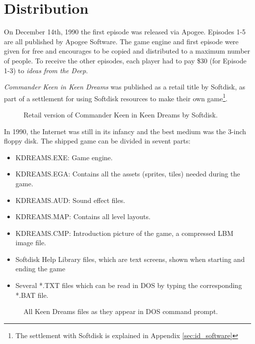 \documentclass[book.tex]{subfiles}
\begin{document}
\section{Distribution}
On December 14th, 1990 the first episode was released via Apogee. Episodes 1-5 are all published by Apogee Software. The game engine and first episode were given for free and encourages to be copied and distributed to a maximum number of people. To receive the other episodes, each player had to pay \$30 (for Episode 1-3) to \textit{ideas from the Deep}.\\

\par
\textit{Commander Keen in Keen Dreams} was published as a retail title by Softdisk, as part of a settlement for using Softdisk resources to make their own game\footnote{The settlement with Softdisk is explained in Appendix \ref{sec:id_software}}.\\

\par
\begin{figure}[H]
\centering
{}
\caption{Retail version of Commander Keen in Keen Dreams by Softdisk.}
\end{figure}


\pagebreak
In 1990, the Internet was still in its infancy and the best medium was the 3-inch floppy disk. The shipped game can be divided in sevent parts:\\
\begin{itemize}
 \item KDREAMS.EXE: Game engine.
 \item KDREAMS.EGA: Contains all the assets (sprites, tiles) needed during the game.
 \item KDREAMS.AUD: Sound effect files.
 \item KDREAMS.MAP: Contains all level layouts.
 \item KDREAMS.CMP: Introduction picture of the game, a compressed LBM image file.
 \item Softdisk Help Library files, which are text screens, shown when starting and ending the game
 \item Several *.TXT files which can be read in DOS by typing the corresponding *.BAT file. 

\end{itemize}

\par
 \begin{figure}[H]
\centering
 \caption{All Keen Dreams files as they appear in DOS command prompt.}
  \end{figure}
 \par
\end{document}
